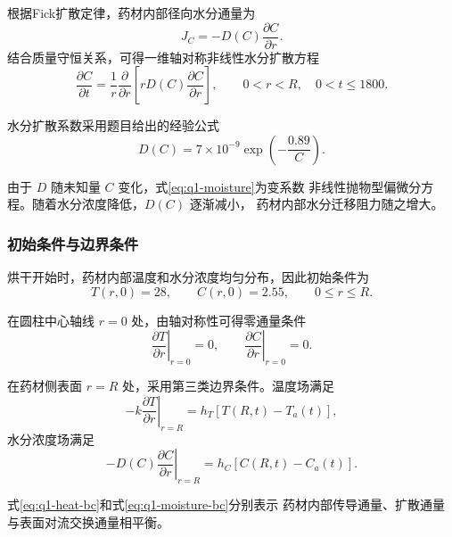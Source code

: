 \documentclass[12pt,a4paper]{article}
\renewcommand{\boxed}[1]{#1}
\begin{document}
\begin{center}
根据Fick扩散定律，药材内部径向水分通量为
\begin{equation}
J_C=-D(C)\frac{\partial C}{\partial r}.
\end{equation}
结合质量守恒关系，可得一维轴对称非线性水分扩散方程
\begin{equation}
\boxed{
\frac{\partial C}{\partial t}
=
\frac{1}{r}
\frac{\partial}{\partial r}
\left[
rD(C)\frac{\partial C}{\partial r}
\right]
},
\qquad
0<r<R,\quad 0<t\le1800.
\label{eq:q1-moisture}
\end{equation}

水分扩散系数采用题目给出的经验公式
\begin{equation}
\boxed{
D(C)
=
7\times10^{-9}
\exp\left(-\frac{0.89}{C}\right)
}.
\label{eq:q1-diffusivity}
\end{equation}

由于 $D$ 随未知量 $C$ 变化，式\eqref{eq:q1-moisture}为变系数
非线性抛物型偏微分方程。随着水分浓度降低，$D(C)$ 逐渐减小，
药材内部水分迁移阻力随之增大。

\subsubsection{初始条件与边界条件}

烘干开始时，药材内部温度和水分浓度均匀分布，因此初始条件为
\begin{equation}
\boxed{
T(r,0)=28,\qquad C(r,0)=2.55
},
\qquad 0\le r\le R.
\label{eq:q1-initial}
\end{equation}

在圆柱中心轴线 $r=0$ 处，由轴对称性可得零通量条件
\begin{equation}
\boxed{
\left.\frac{\partial T}{\partial r}\right|_{r=0}=0,
\qquad
\left.\frac{\partial C}{\partial r}\right|_{r=0}=0
}.
\label{eq:q1-center}
\end{equation}

在药材侧表面 $r=R$ 处，采用第三类边界条件。温度场满足
\begin{equation}
\boxed{
-k\left.\frac{\partial T}{\partial r}\right|_{r=R}
=
h_T\left[T(R,t)-T_a(t)\right]
},
\label{eq:q1-heat-bc}
\end{equation}
水分浓度场满足
\begin{equation}
\boxed{
-D(C)\left.\frac{\partial C}{\partial r}\right|_{r=R}
=
h_C\left[C(R,t)-C_a(t)\right]
}.
\label{eq:q1-moisture-bc}
\end{equation}

式\eqref{eq:q1-heat-bc}和式\eqref{eq:q1-moisture-bc}分别表示
药材内部传导通量、扩散通量与表面对流交换通量相平衡。


\end{center}
\end{document}
